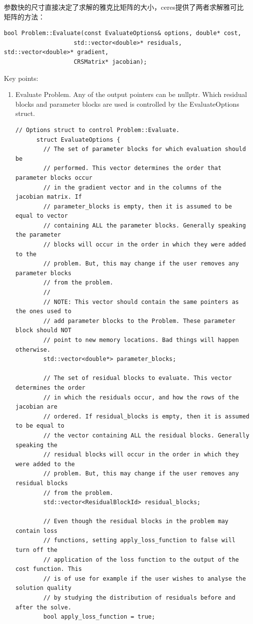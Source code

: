 \documentclass[12pt, onecolumn]{article}
\newcommand\normf{\fangsong}
\begin{document}
	参数快的尺寸直接决定了求解的雅克比矩阵的大小，ceres提供了两者求解雅可比矩阵的方法：
	\begin{lstlisting}[caption=\normf{Problem类的提供的雅克比矩阵求解}]
	bool Problem::Evaluate(const EvaluateOptions& options, double* cost,
	                std::vector<double>* residuals, std::vector<double>* gradient,
	                CRSMatrix* jacobian);
	\end{lstlisting}
	Key points:
	\begin{enumerate}
	\item Evaluate Problem. Any of the output pointers can be nullptr. Which residual
	blocks and parameter blocks are used is controlled by the EvaluateOptions
	struct.
	
	\begin{lstlisting}[caption=EvaluateOptions]
	// Options struct to control Problem::Evaluate.
	  struct EvaluateOptions {
	    // The set of parameter blocks for which evaluation should be
	    // performed. This vector determines the order that parameter blocks occur
	    // in the gradient vector and in the columns of the jacobian matrix. If
	    // parameter_blocks is empty, then it is assumed to be equal to vector
	    // containing ALL the parameter blocks. Generally speaking the parameter
	    // blocks will occur in the order in which they were added to the
	    // problem. But, this may change if the user removes any parameter blocks
	    // from the problem.
	    //
	    // NOTE: This vector should contain the same pointers as the ones used to
	    // add parameter blocks to the Problem. These parameter block should NOT
	    // point to new memory locations. Bad things will happen otherwise.
	    std::vector<double*> parameter_blocks;
	
	    // The set of residual blocks to evaluate. This vector determines the order
	    // in which the residuals occur, and how the rows of the jacobian are
	    // ordered. If residual_blocks is empty, then it is assumed to be equal to
	    // the vector containing ALL the residual blocks. Generally speaking the
	    // residual blocks will occur in the order in which they were added to the
	    // problem. But, this may change if the user removes any residual blocks
	    // from the problem.
	    std::vector<ResidualBlockId> residual_blocks;
	
	    // Even though the residual blocks in the problem may contain loss
	    // functions, setting apply_loss_function to false will turn off the
	    // application of the loss function to the output of the cost function. This
	    // is of use for example if the user wishes to analyse the solution quality
	    // by studying the distribution of residuals before and after the solve.
	    bool apply_loss_function = true;
	

\end{lstlisting}
\end{enumerate}
\end{document}

